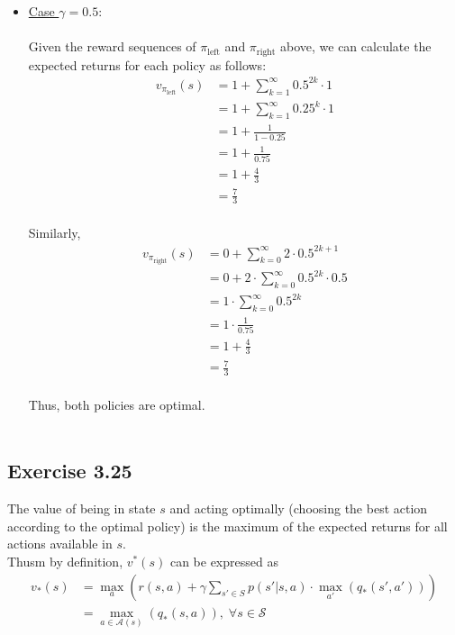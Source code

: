 \documentclass{article}
\begin{document}
\begin{itemize}
    \item \underline{Case $\gamma=0.5$}:\\\\
    Given the reward sequences of $\pi_{\text{left}}$ and $\pi_{\text{right}}$ above, we can calculate the expected returns for each policy as follows:
    \begin{equation*}
        \begin{aligned}
            v_{\pi_{\text{left}}}(s) &= 1 + \sum_{k=1}^{\infty} 0.5^{2k}\cdot 1\\
            &= 1 + \sum_{k=1}^{\infty} 0.25^{k}\cdot 1\\
            &= 1 + \frac{1}{1-0.25}\\
            &= 1 + \frac{1}{0.75}\\
            &= 1 + \frac{4}{3}\\
            &= \frac{7}{3}\\
        \end{aligned}
    \end{equation*}\par
    Similarly,
    \begin{equation*}
        \begin{aligned}
            v_{\pi_{\text{right}}}(s) &= 0 + \sum_{k=0}^{\infty} 2\cdot 0.5^{2k+1}\\
            &= 0 + 2 \cdot \sum_{k=0}^{\infty} 0.5^{2k}\cdot 0.5\\
            &= 1 \cdot \sum_{k=0}^{\infty} 0.5^{2k}\\
            &= 1 \cdot \frac{1}{0.75}\\
            &= 1 + \frac{4}{3}\\
            &= \frac{7}{3}\\
        \end{aligned}
    \end{equation*}\par 
    Thus, both policies are optimal.\\\\
\end{itemize}
\subsection*{Exercise 3.25}
The value of being in state $s$ and acting optimally (choosing the best action according to the optimal policy) is the maximum of the expected returns for all actions available in $s$.\\
Thusm by definition, $v^{*}(s)$ can be expressed as
\begin{equation*}
    \begin{aligned}
        v_{*}(s) &= \max_{a}\left(r(s,a) + \gamma \sum_{s'\in S} p(s'|s,a)\cdot \max_{a'}(q_{*}(s',a'))\right)\\
        &= \max_{a \in \mathcal{A}(s)}(q_{*}(s,a)),\; \forall s \in \mathcal{S}\\
    \end{aligned}
\end{equation*}
\end{document}
